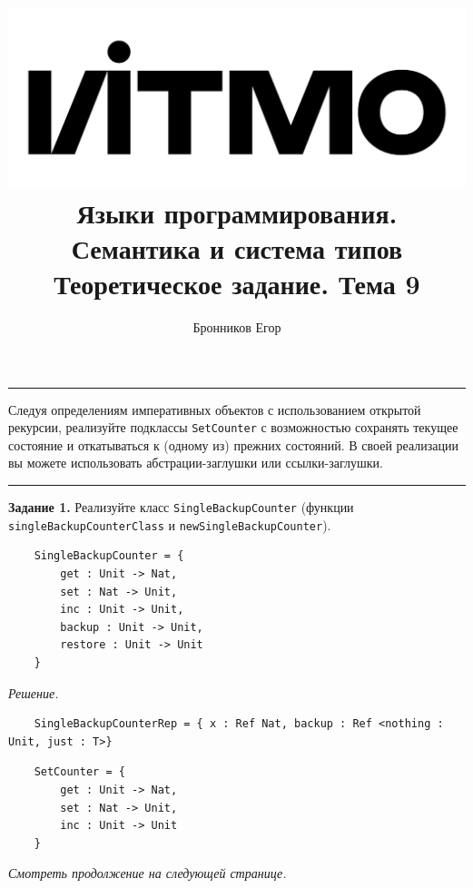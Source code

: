\documentclass[landscape, 11pt]{report}
\title{
\includegraphics[scale=0.07]{logo}\\
\vspace{0.5em}
Языки программирования. Семантика и система типов\\
\vspace{0.2em}
\Large Теоретическое задание. Тема 9
}
\author{Бронников Егор}
\date{}
\begin{document}

\maketitle


\vspace{-0.5cm}
\hrule
\vspace{0.5cm}

Следуя определениям императивных объектов с использованием открытой рекурсии, реализуйте подклассы \verb|SetCounter| с возможностью сохранять текущее состояние и откатываться к (одному из) прежних состояний. В своей реализации вы можете использовать абстрации-заглушки или ссылки-заглушки.

\vspace{0.5cm}
\hrule
\vspace{0.5cm}


\textbf{Задание 1.} Реализуйте класс \verb|SingleBackupCounter| (функции \verb|singleBackupCounterClass| и \verb|newSingleBackupCounter|).

\begin{verbatim}
	SingleBackupCounter = {
	    get : Unit -> Nat,
	    set : Nat -> Unit,
	    inc : Unit -> Unit,
	    backup : Unit -> Unit,
	    restore : Unit -> Unit
	}
\end{verbatim}


\textit{Решение.}

\begin{verbatim}
	SingleBackupCounterRep = { x : Ref Nat, backup : Ref <nothing : Unit, just : T>}
\end{verbatim}

\begin{verbatim}
	SetCounter = {
	    get : Unit -> Nat,
	    set : Nat -> Unit,
	    inc : Unit -> Unit
	}
\end{verbatim}

\vfill

\footnotesize

\begin{center}
	\textit{Смотреть продолжение на следующей странице.}
\end{center}

\normalsize

\newpage
\end{document}

